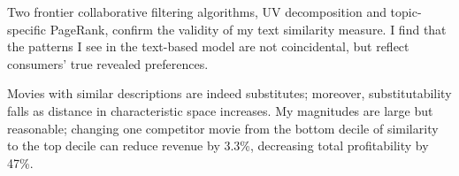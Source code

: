 \documentclass{article}
\begin{document}
Two frontier collaborative filtering algorithms, UV decomposition and topic-specific PageRank, confirm the validity of my text similarity measure. I find that the patterns I see in the text-based model are not coincidental, but reflect consumers' true revealed preferences.

Movies with similar descriptions are indeed substitutes; moreover, substitutability falls as distance in characteristic space increases. My magnitudes are large but reasonable; changing one competitor movie from the bottom decile of similarity to the top decile can reduce revenue by 3.3\%, decreasing total profitability by 47\%. 


\printbibliography

\pagebreak
\end{document}
